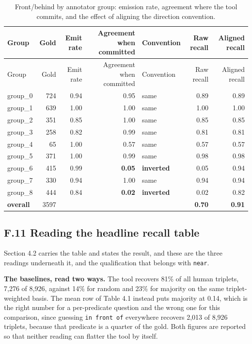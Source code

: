 \begin{center}
\setlength{\tabcolsep}{3pt}
\footnotesize
\begin{longtable}{lrrrlrr}
\caption[Front/behind by annotator group]{Front/behind by annotator group: emission rate, agreement where the tool commits, and the effect of aligning the direction convention.}\\
\hline
Group & Gold & Emit rate & Agreement when committed & Convention & Raw recall & Aligned recall \\
\hline
\endfirsthead
\hline
Group & Gold & Emit rate & Agreement when committed & Convention & Raw recall & Aligned recall \\
\hline
\endhead
group\_\allowbreak{}0 & 724 & 0.94 & 0.95 & same & 0.89 & 0.89 \\
group\_\allowbreak{}1 & 639 & 1.00 & 1.00 & same & 1.00 & 1.00 \\
group\_\allowbreak{}2 & 351 & 0.85 & 1.00 & same & 0.85 & 0.85 \\
group\_\allowbreak{}3 & 258 & 0.82 & 0.99 & same & 0.81 & 0.81 \\
group\_\allowbreak{}4 & 65 & 1.00 & 0.57 & same & 0.57 & 0.57 \\
group\_\allowbreak{}5 & 371 & 1.00 & 0.99 & same & 0.98 & 0.98 \\
group\_\allowbreak{}6 & 415 & 0.99 & \textbf{0.05} & \textbf{inverted} & 0.05 & 0.94 \\
group\_\allowbreak{}7 & 330 & 0.94 & 1.00 & same & 0.94 & 0.94 \\
group\_\allowbreak{}8 & 444 & 0.84 & \textbf{0.02} & \textbf{inverted} & 0.02 & 0.82 \\
\textbf{overall} & 3597 &  &  &  & \textbf{0.70} & \textbf{0.91} \\
\hline
\end{longtable}
\end{center}

\subsection{F.11 Reading the headline recall table}

Section 4.2 carries the table and states the result, and these are the three readings underneath it, and the qualification that belongs with \texttt{near}.

\textbf{The baselines, read two ways.} The tool recovers 81\% of all human triplets, 7,276 of 8,926, against 14\% for random and 23\% for majority on the same triplet-weighted basis. The mean row of Table 4.1 instead puts majority at 0.14, which is the right number for a per-predicate question and the wrong one for this comparison, since guessing \texttt{in front of} everywhere recovers 2,013 of 8,926 triplets, because that predicate is a quarter of the gold. Both figures are reported so that neither reading can flatter the tool by itself.

